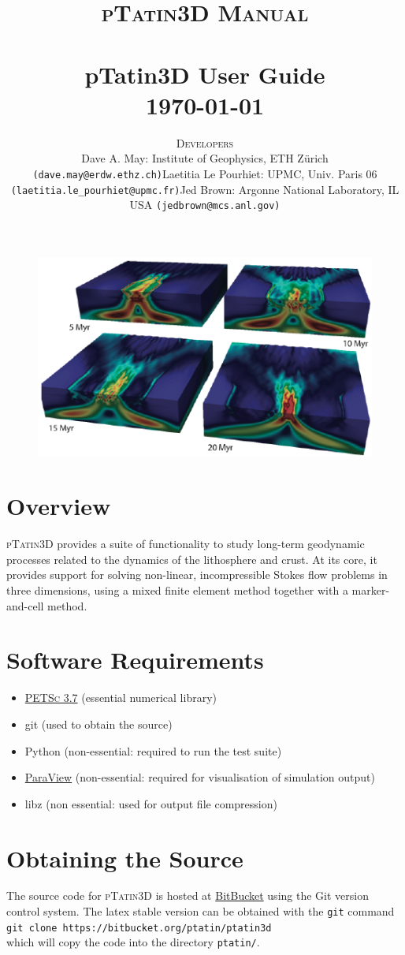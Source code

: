 \documentclass[paper=a4, fontsize=11pt,twoside]{scrartcl}
\title{	\normalsize \textsc{pTatin3D Manual} 	%
	\\[2.0cm]									%
	\HRule{2pt} \\ [0.3cm]						%
	\LARGE \textbf{{pTatin3D User Guide}}			%
	\HRule{2pt} \\ [0.5cm]						%
	\normalsize \today							%
	}
\author{
{\normalsize \textsc{Developers}}
\begin{itemize}
\item[-] Dave A. May: Institute of Geophysics, ETH Z{\"u}rich \texttt{(dave.may@erdw.ethz.ch)} 
\item[-] Laetitia Le Pourhiet: UPMC, Univ. Paris 06  \texttt{(laetitia.le\_pourhiet@upmc.fr)}
\item[-] Jed Brown: Argonne National Laboratory, IL USA  \texttt{(jedbrown@mcs.anl.gov)}
\end{itemize}
}
\makeatletter
\newcommand{\ptat}{{{\textsc{pTatin3D}}}}
\newcommand{\PETSc}{{{\textsc{PETSc}}}}
\newcommand{\shellcmd}[1]{\\\indent\indent\texttt{\hspace{5mm}\footnotesize #1}\\}
\newcommand{\unix}[1]{\texttt{\footnotesize #1}}
\def\printtitle{%
    {
    	\centering \@title\par}
		 	\vspace{10mm}
	\begin{figure} [hbtp]
	\includegraphics[height=0.4\textheight]{figs/ptat3d_front_page_small.pdf}
	\end{figure}
    }
\def\printauthor{%
    {\centering \large \@author}}
\makeatother
\begin{document}
\thispagestyle{empty}%

\printtitle%
  	\vfill
\printauthor%




\newpage
{}
\tableofcontents{}

\newpage


\section{Overview}
{\ptat} provides a suite of functionality to study long-term geodynamic processes related to the dynamics of the lithosphere and crust.
At its core, it provides support for solving non-linear, incompressible Stokes flow problems in three dimensions, using a mixed finite element method together with a marker-and-cell method.




\newpage
\section{Software Requirements}
\begin{itemize}
  \item \href{http://www.mcs.anl.gov/petsc}{{\PETSc} 3.7} (essential numerical library)
	\item git (used to obtain the source)
	\item Python (non-essential: required to run the test suite)
	\item \href{www.paraview.org}{ParaView} (non-essential: required for visualisation of simulation output)
	\item libz (non essential: used for output file compression)
\end{itemize}

\section{Obtaining the Source}
The source code for {\ptat} is hosted at \href{https://bitbucket.org}{BitBucket} using the Git version control system.
The latex stable version can be obtained with the \unix{git} command
\shellcmd{git clone https://bitbucket.org/ptatin/ptatin3d}
which will copy the code into the directory \unix{ptatin/}.
\end{document}
